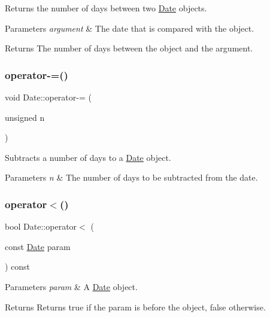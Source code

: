 Returns the number of days between two \hyperlink{classDate}{Date} objects. 


\begin{DoxyParams}{Parameters}
{\em argument} & The date that is compared with the object. \\
\hline
\end{DoxyParams}
\begin{DoxyReturn}{Returns}
The number of days between the object and the argument. 
\end{DoxyReturn}
\mbox{\label{classDate_a63f3a52b0561bcfab6f723a0e108f64e}} 
\subsubsection{\texorpdfstring{operator-\/=()}{operator-=()}}
{\footnotesize\ttfamily void Date\+::operator-\/= (\begin{DoxyParamCaption}\item[{unsigned}]{n }\end{DoxyParamCaption})}



Subtracts a number of days to a \hyperlink{classDate}{Date} object. 


\begin{DoxyParams}{Parameters}
{\em n} & The number of days to be subtracted from the date. \\
\hline
\end{DoxyParams}
\mbox{\label{classDate_a931e536af8cdda20dd9f13be4a1b1eaa}} 
\subsubsection{\texorpdfstring{operator$<$()}{operator<()}}
{\footnotesize\ttfamily bool Date\+::operator$<$ (\begin{DoxyParamCaption}\item[{const \hyperlink{classDate}{Date}}]{param }\end{DoxyParamCaption}) const}


\begin{DoxyParams}{Parameters}
{\em param} & A \hyperlink{classDate}{Date} object. \\
\hline
\end{DoxyParams}
\begin{DoxyReturn}{Returns}
Returns true if the param is before the object, false otherwise. 
\end{DoxyReturn}
\mbox{\label{classDate_ad4d1bf445fe1fa901f9f64ce7a0761d4}} 
